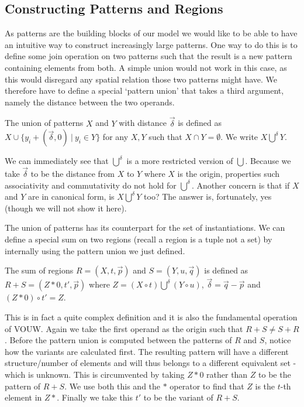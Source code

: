 \documentclass{llncs}
\begin{document}
\subsection{Constructing Patterns and Regions}

As patterns are the building blocks of our model we would like to be able to have an intuitive way to construct increasingly large patterns. One way to do this is to define some join operation on two patterns such that the result is a new pattern containing elements from both. A simple union would not work in this case, as this would disregard any spatial relation those two patterns might have. We therefore have to define a special `pattern union' that takes a third argument, namely the distance between the two operands. 

\begin{definition}
The union of patterns $X$ and $Y$ with distance $\vec{\delta}$ is defined as $X\cup\{y_i + (\vec{\delta},0) \ | \ y_i \in Y\}$ for any $X,Y$ such that $X\cap Y=\emptyset$.
We write $X\bigcup^{\delta}Y$.
\end{definition}
We can immediately see that $\bigcup^{\delta}$ is a more restricted version of $\bigcup$. Because we take $\vec{\delta}$ to be the distance from $X$ to $Y$ where $X$ is the origin, properties such associativity and commutativity do not hold for $\bigcup^{\delta}$. Another concern is that if $X$ and $Y$ are in canonical form, is $X\bigcup^{\delta}Y$ too? The answer is, fortunately, yes (though we will not show it here). 

The union of patterns has its counterpart for the set of instantiations. We can define a special sum on two regions (recall a region is a tuple not a set) by internally using the pattern union we just defined.

\begin{definition}
The sum of regions $R=(X,t,\vec{p})$ and $S=(Y,u,\vec{q})$ is defined as $R+S=(Z*0,t',\vec{p})$ where $Z=(X\circ t) \bigcup^{\delta} (Y\circ u)$, $\vec{\delta}=\vec{q}-\vec{p}$ and $(Z*0)\circ t'=Z$.
\end{definition}

This is in fact a quite complex definition and it is also the fundamental operation of VOUW. Again we take the first operand as the origin such that $R+S\neq S+R$. Before the pattern union is computed between the patterns of $R$ and $S$, notice how the variants are calculated first. The resulting pattern will have a different structure/number of elements and will thus belongs to a different equivalent set - which is unknown. This is circumvented by taking $Z*0$ rather than $Z$ to be the pattern of $R+S$. We use both this and the $*$ operator to find that $Z$ is the $t$-th element in $Z*$. Finally we take this $t'$ to be the variant of $R+S$.
\end{document}
